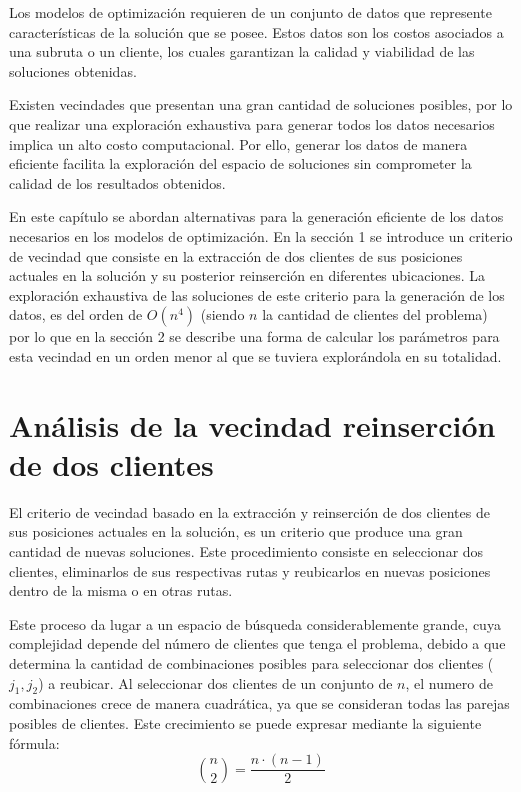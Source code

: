 \documentclass{article}
\begin{document}
Los modelos de optimización requieren de un conjunto de datos que represente características de la solución que se posee. Estos datos son los costos asociados a una subruta o un cliente, los cuales garantizan la calidad y viabilidad de las soluciones obtenidas.

Existen vecindades que presentan una gran cantidad de soluciones posibles, por lo que realizar una exploración exhaustiva para generar todos los datos necesarios implica un alto costo computacional. Por ello, generar los datos de manera eficiente facilita la exploración del espacio de soluciones sin comprometer la calidad de los resultados obtenidos.

En este capítulo se abordan alternativas para la generación eficiente de los datos necesarios en los modelos de optimización. En la sección 1 se introduce un criterio de vecindad que consiste en la extracción de dos clientes de sus posiciones actuales en la solución y su posterior reinserción en diferentes ubicaciones. La exploración exhaustiva de las soluciones de este criterio para la generación de los datos, es del orden de $O(n^4)$ (siendo $n$ la cantidad de clientes del problema) por lo que en la sección 2 se describe una forma de calcular los parámetros para esta vecindad en un orden menor al que se tuviera explorándola en su totalidad.


\section{Análisis de la vecindad reinserción de dos clientes}  

El criterio de vecindad basado en la extracción y reinserción de dos clientes de sus posiciones actuales en la solución, es un criterio que produce una gran cantidad de nuevas soluciones. Este procedimiento consiste en seleccionar dos clientes, eliminarlos de sus respectivas rutas y reubicarlos en nuevas posiciones dentro de la misma o en otras rutas.  

Este proceso da lugar a un espacio de búsqueda considerablemente grande, cuya complejidad depende del número de clientes que tenga el problema, debido a que determina la cantidad de combinaciones posibles para seleccionar dos clientes ($j_1,j_2$) a reubicar. Al seleccionar dos clientes de un conjunto de $n$, el numero de combinaciones crece de manera cuadrática, ya que se consideran todas las parejas posibles de clientes. Este crecimiento se puede expresar mediante la siguiente fórmula:
\[
\binom{n}{2} = \frac{n\cdot (n-1)}{2}
\]
\end{document}
